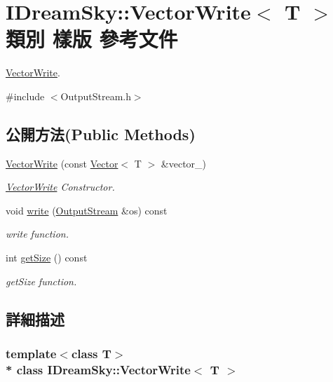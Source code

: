 \hypertarget{class_i_dream_sky_1_1_vector_write}{}\section{I\+Dream\+Sky\+:\+:Vector\+Write$<$ T $>$ 類別 樣版 參考文件}
\label{class_i_dream_sky_1_1_vector_write}


\hyperlink{class_i_dream_sky_1_1_vector_write}{Vector\+Write}.  




{\ttfamily \#include $<$Output\+Stream.\+h$>$}

\subsection*{公開方法(Public Methods)}
\begin{DoxyCompactItemize}
\item 
\hyperlink{class_i_dream_sky_1_1_vector_write_afc6ed3e4eaba5b87e57a639094e6ff07}{Vector\+Write} (const \hyperlink{class_i_dream_sky_1_1_vector}{Vector}$<$ T $>$ \&vector\+\_\+)
\begin{DoxyCompactList}\small\item\em \hyperlink{class_i_dream_sky_1_1_vector_write}{Vector\+Write} Constructor. \end{DoxyCompactList}\item 
void \hyperlink{class_i_dream_sky_1_1_vector_write_a9a61c1e933edc0e092ba822c8bf671cd}{write} (\hyperlink{class_i_dream_sky_1_1_output_stream}{Output\+Stream} \&os) const 
\begin{DoxyCompactList}\small\item\em write function. \end{DoxyCompactList}\item 
int \hyperlink{class_i_dream_sky_1_1_vector_write_aa1e587a2ab58ed2ec6f6acecfdac3862}{get\+Size} () const 
\begin{DoxyCompactList}\small\item\em get\+Size function. \end{DoxyCompactList}\end{DoxyCompactItemize}


\subsection{詳細描述}
\subsubsection*{template$<$class T$>$\\*
class I\+Dream\+Sky\+::\+Vector\+Write$<$ T $>$}

